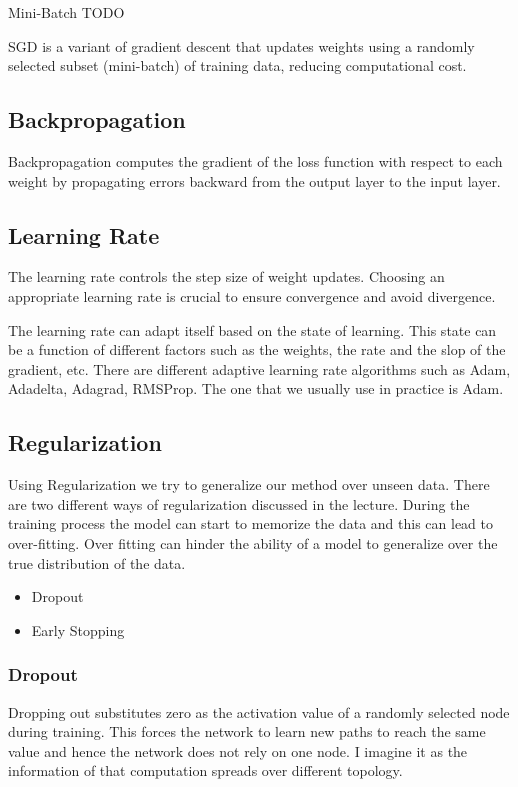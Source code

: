 \documentclass[a4paper,12pt]{article}
\begin{document}
Mini-Batch TODO

\begin{tcolorbox}[colback=blue!5!white,colframe=blue!75!black,title=Stochastic Gradient Descent]
  SGD is a variant of gradient descent that updates weights using a randomly selected subset (mini-batch)
  of training data, reducing computational cost.
\end{tcolorbox}

\subsection{Backpropagation}
Backpropagation computes the gradient of the loss function with respect to each weight by propagating
errors backward from the output layer to the input layer.

\subsection{Learning Rate}
The learning rate controls the step size of weight updates. Choosing an appropriate learning rate is
crucial to ensure convergence and avoid divergence.

The learning rate can adapt itself based on the state of learning. This state can be a function of
different factors such as the weights, the rate and the slop of the gradient, etc.
There are different adaptive learning rate algorithms such as Adam, Adadelta, Adagrad, RMSProp.
The one that we usually use in practice is Adam.

\subsection{Regularization}
Using Regularization we try to generalize our method over unseen data. There are two different ways of regularization discussed
in the lecture. During the training process the model can start to memorize the data and this can lead to over-fitting.
Over fitting can hinder the ability of a model to generalize over the true distribution of the data.
\begin{itemize}
  \item Dropout
  \item Early Stopping
\end{itemize}

\subsubsection{Dropout}
Dropping out substitutes zero as the activation value of a randomly selected node during training. This forces
the network to learn new paths to reach the same value and hence the network does not rely on one node. I imagine it
as the information of that computation spreads over different topology.
\end{document}
